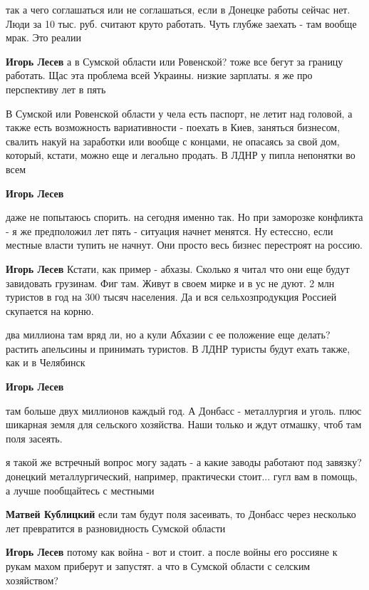 \begin{itemize}
\begin{itemize}
так а чего соглашаться или не соглашаться, если в Донецке работы сейчас нет. Люди за 10 тыс. руб. считают круто работать. Чуть глубже заехать - там вообще мрак. Это реалии

\textbf{Игорь Лесев} а в Сумской области или Ровенской? тоже все бегут за границу работать. Щас эта проблема всей Украины. низкие зарплаты. я же про перспективу лет в пять


В Сумской или Ровенской области у чела есть паспорт, не летит над головой, а
также есть возможность вариативности - поехать в Киев, заняться бизнесом,
свалить накуй на заработки или вообще с концами, не опасаясь за свой дом,
который, кстати, можно еще и легально продать. В ЛДНР у пипла непонятки во всем


\textbf{Игорь Лесев} 

даже не попытаюсь спорить. на сегодня именно так. Но при заморозке конфликта -
я же предположил лет пять - ситуация начнет менятся. Ну естессно, если местные
власти тупить не начнут. Они просто весь бизнес перестроят на россию.

\textbf{Игорь Лесев} Кстати, как пример - абхазы. Сколько я читал что они еще будут завидовать грузинам. Фиг там. Живут в своем мирке и в ус не дуют. 2 млн туристов в год на 300 тысяч населения. Да и вся сельхозпродукция Россией скупается на корню.


два миллиона там вряд ли, но а кули Абхазии с ее положение еще делать? растить
апельсины и принимать туристов. В ЛДНР туристы будут ехать также, как и в
Челябинск

\textbf{Игорь Лесев} 

там больше двух миллионов каждый год. А Донбасс - металлургия и уголь. плюс
шикарная земля для сельского хозяйства. Наши только и ждут отмашку, чтоб там
поля засеять.


я такой же встречный вопрос могу задать - а какие заводы работают под завязку?
донецкий металлургический, например, практически стоит... гугл вам в помощь, а
лучше пообщайтесь с местными

\textbf{Матвей Кублицкий} если там будут поля засеивать, то Донбасс через несколько лет превратится в разновидность Сумской области

\textbf{Игорь Лесев} потому как война - вот и стоит. а после войны его россияне к рукам махом приберут и запустят. а что в Сумской области с селским хозяйством?


\end{itemize}
\end{itemize}
